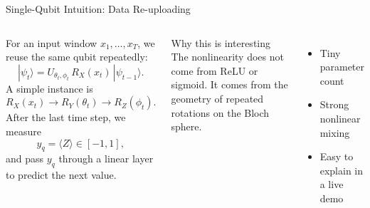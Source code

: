 \documentclass[aspectratio=169,professionalfonts]{beamer}
\begin{document}
\begin{frame}{Single-Qubit Intuition: Data Re-uploading}
\begin{columns}[T]
For an input window $x_1,\dots,x_T$, we reuse the same qubit repeatedly:
\[
|\psi_t\rangle = U_{\theta_t,\phi_t}\,R_X(x_t)\,|\psi_{t-1}\rangle.
\]
A simple instance is
\[
R_X(x_t) \rightarrow R_Y(\theta_t) \rightarrow R_Z(\phi_t).
\]
After the last time step, we measure
\[
y_q = \langle Z \rangle \in [-1,1],
\]
and pass $y_q$ through a linear layer to predict the next value.

\begin{block}{Why this is interesting}
The nonlinearity does not come from ReLU or sigmoid. It comes from the geometry of repeated rotations on the Bloch sphere.
\end{block}

\vspace{0.5em}
\begin{itemize}
  \item Tiny parameter count
  \item Strong nonlinear mixing
  \item Easy to explain in a live demo
\end{itemize}
\end{columns}
\end{frame}
\end{document}
